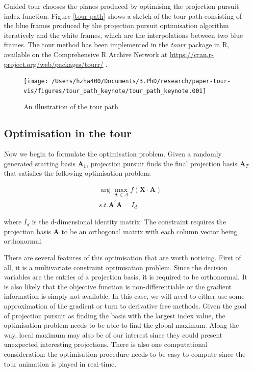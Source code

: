 \documentclass[12pt]{article}
\begin{document}
Guided tour chooses the planes produced by optimising the projection pursuit index function. Figure \ref{tour-path} shows a sketch of the tour path consisting of the blue frames produced by the projection pursuit optimisation algorithm iteratively and the white frames, which are the interpolations between two blue frames. The tour method has been implemented in the \emph{tourr} package in R, available on the Comprehensive R Archive Network at \url{https://cran.r-project.org/web/packages/tourr/} \citep{wickham2011tourrpackage}.

\begin{figure}

{\centering \texttt{[image: /Users/hzha400/Documents/3.PhD/research/paper-tour-vis/figures/tour\_path\_keynote/tour\_path\_keynote.001]} 

}

\caption{\label{tour-path}An illustration of the tour path}\label{fig:tour-path}
\end{figure}

\hypertarget{tour-optim}{%
\subsection{Optimisation in the tour}\label{tour-optim}}

Now we begin to formulate the optimisation problem. Given a randomly generated starting basis \(\mathbf{A}_1\), projection pursuit finds the final projection basis \(\mathbf{A}_T\) that satisfies the following optimisation problem:

\begin{align}
&\arg \max_{\mathbf{A} \in \mathcal{A}} f(\mathbf{X} \cdot \mathbf{A}) \\
&s.t.  \mathbf{A}^{\prime} \mathbf{A} = I_d
\end{align}

where \(I_d\) is the d-dimensional identity matrix. The constraint requires the projection basis \(\mathbf{A}\) to be an orthogonal matrix with each column vector being orthonormal.

There are several features of this optimisation that are worth noticing. First of all, it is a multivariate constraint optimisation problem. Since the decision variables are the entries of a projection basis, it is required to be orthonormal. It is also likely that the objective function is non-differentiable or the gradient information is simply not available. In this case, we will need to either use some approximation of the gradient or turn to derivative free methods. Given the goal of projection pursuit as finding the basis with the largest index value, the optimisation problem needs to be able to find the global maximum. Along the way, local maximum may also be of our interest since they could present unexpected interesting projections. There is also one computational consideration: the optimisation procedure needs to be easy to compute since the tour animation is played in real-time.
\end{document}
